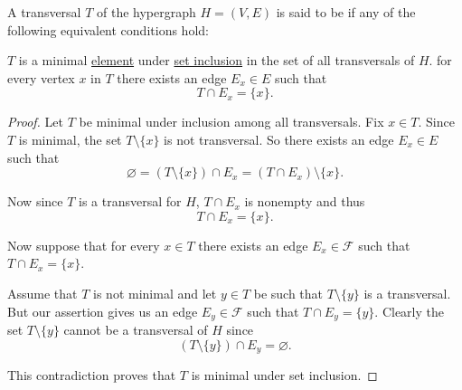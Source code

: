 \begin{definition}\label{def:minimal_hypergraph_transversal}
  A transversal \( T \) of the hypergraph \( H = (V, E) \) is said to be  if any of the following equivalent conditions hold:
  \begin{thmenum}
     \( T \) is a minimal \hyperref[def:partially_ordered_set_extremal_points/maximal_and_minimal_element]{element} under \hyperref[def:subset]{set inclusion} in the set of all transversals of \( H \).
     for every vertex \( x \) in \( T \) there exists an edge \( E_x \in E \) such that
    \begin{equation*}
      T \cap E_x = \{ x \}.
    \end{equation*}
  \end{thmenum}
\end{definition}
\begin{proof}
   Let \( T \) be minimal under inclusion among all transversals. Fix \( x \in T \). Since \( T \) is minimal, the set \( T \setminus \{ x \} \) is not transversal. So there exists an edge \( E_x \in E \) such that
  \begin{equation*}
    \varnothing = (T \setminus \{ x \}) \cap E_x = (T \cap E_x) \setminus \{ x \}.
  \end{equation*}

  Now since \( T \) is a transversal for \( H \), \( T \cap E_x \) is nonempty and thus
  \begin{equation*}
    T \cap E_x = \{ x \}.
  \end{equation*}

   Now suppose that for every \( x \in T \) there exists an edge \( E_x \in \mathcal{F} \) such that \( T \cap E_x = \{ x \} \).

  Assume that \( T \) is not minimal and let \( y \in T \) be such that \( T \setminus \{ y \} \) is a transversal. But our assertion gives us an edge \( E_y \in \mathcal{F} \) such that \( T \cap E_y = \{ y \} \). Clearly the set \( T \setminus \{ y \} \) cannot be a transversal of \( H \) since
  \begin{equation*}
    (T \setminus \{ y \}) \cap E_y = \varnothing.
  \end{equation*}

  This contradiction proves that \( T \) is minimal under set inclusion.
\end{proof}


